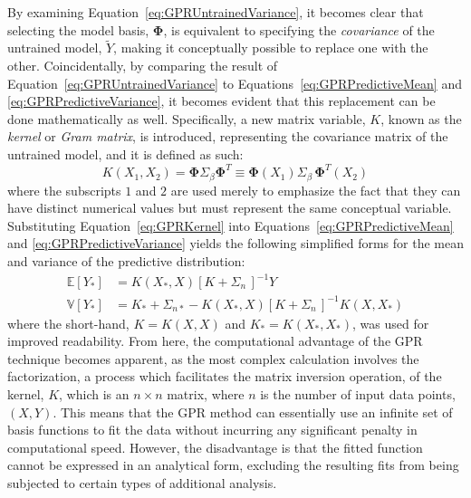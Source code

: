 \documentclass{article}
\begin{document}
By examining Equation~\eqref{eq:GPRUntrainedVariance}, it becomes clear that selecting the model basis, $\mathbf{\Phi}$, is equivalent to specifying the \emph{covariance} of the untrained model, $\widetilde{Y}$, making it conceptually possible to replace one with the other. Coincidentally, by comparing the result of Equation~\eqref{eq:GPRUntrainedVariance} to Equations~\eqref{eq:GPRPredictiveMean} and \eqref{eq:GPRPredictiveVariance}, it becomes evident that this replacement can be done mathematically as well. Specifically, a new matrix variable, $K$, known as the \emph{kernel} or \emph{Gram matrix}, is introduced, representing the covariance matrix of the untrained model, and it is defined as such:
\begin{equation}
\label{eq:GPRKernel}
	K\!\left(X_1,X_2\right) = \mathbf{\Phi} \Sigma_\beta \mathbf{\Phi}^T \equiv \mathbf{\Phi}\!\left(X_1\right) \Sigma_\beta \, \mathbf{\Phi}^T\!\left(X_2\right)
\end{equation}
where the subscripts $1$ and $2$ are used merely to emphasize the fact that they can have distinct numerical values but must represent the same conceptual variable. Substituting Equation~\eqref{eq:GPRKernel} into Equations~\eqref{eq:GPRPredictiveMean} and \eqref{eq:GPRPredictiveVariance} yields the following simplified forms for the mean and variance of the predictive distribution:
\begin{equation}
\label{eq:GPRPrediction}
	\begin{aligned}
	\mathbb{E}\!\left[Y_*\right] &= K\!\left(X_*,X\right) \left[K + \Sigma_n\,\right]^{-1} Y \\
	\mathbb{V}\!\left[Y_*\right] &= K_* + \Sigma_{n*} - K\!\left(X_*,X\right) \left[K + \Sigma_n\,\right]^{-1} K\!\left(X,X_*\right)
	\end{aligned}
\end{equation}
where the short-hand, $K=K\!\left(X,X\right)$ and $K_*=K\!\left(X_*,X_*\right)$, was used for improved readability. From here, the computational advantage of the GPR technique becomes apparent, as the most complex calculation involves the factorization, a process which facilitates the matrix inversion operation, of the kernel, $K$, which is an $n \times n$ matrix, where $n$ is the number of input data points, $\left(X,Y\right)$. This means that the GPR method can essentially use an infinite set of basis functions to fit the data without incurring any significant penalty in computational speed. However, the disadvantage is that the fitted function cannot be expressed in an analytical form, excluding the resulting fits from being subjected to certain types of additional analysis.
\end{document}
